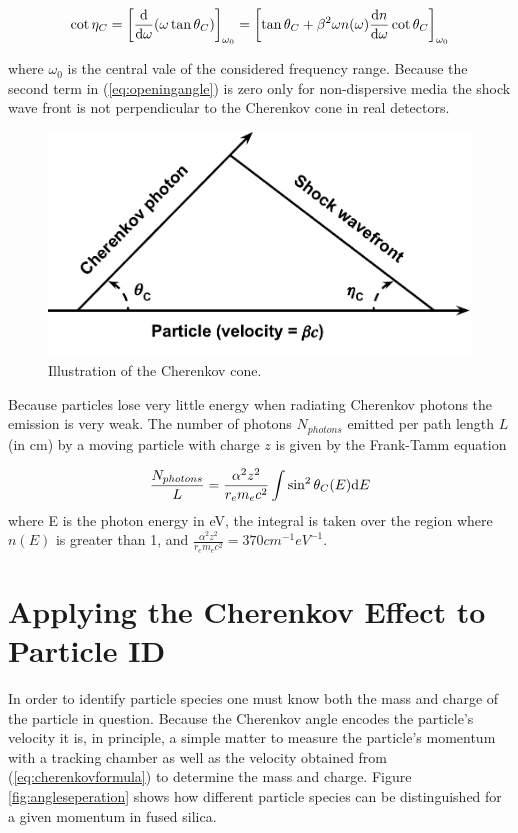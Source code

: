 \begin{equation}
	\cot\eta_C = \left[\frac{\mathrm{d}}{\mathrm{d}\omega}(\omega \tan\theta_{C}) \right]_{\omega_0} = \left[\tan\theta_{C} + \beta^2\omega n(\omega) \frac{\mathrm{d} n}{\mathrm{d}\omega}\cot\theta_{C} \right]_{\omega_0}
	\label{eq:openingangle}
\end{equation}

where $\omega_0$ is the central vale of the considered frequency range. Because the second term in (\ref{eq:openingangle}) is zero only for non-dispersive media the shock wave front is not perpendicular to the Cherenkov cone in real detectors.

\begin{figure}[ht]
	\centering
	\includegraphics[scale=1]{figures/Cherenkov_cone.pdf}
	\caption{Illustration of the Cherenkov cone.}
	\label{fig:cherenkovcone}
\end{figure}

Because particles lose very little energy when radiating Cherenkov photons the emission is very weak. The number of photons $N_{photons}$ emitted per path length $L$ (in cm) by a moving particle with charge $z$ is given by the Frank-Tamm equation

\begin{equation}
	\frac{N_{photons}}{L} = \frac{\alpha^2 z^2}{r_e m_e c^2} \int \sin^2\theta_{C} (E) \mathrm{d} E
	\label{eq:nphotons}
\end{equation}
where E is the photon energy in eV, the integral is taken over the region where $n(E)$ is greater than 1, and $\frac{\alpha^2 z^2}{r_e m_e c^2} = 370\unit{cm}^{-1}\unit{eV}^{-1}$.

\section{Applying the Cherenkov Effect to Particle ID}
In order to identify particle species one must know both the mass and charge of the particle in question. Because the Cherenkov angle encodes the particle's velocity it is, in principle, a simple matter to measure the particle's momentum with a tracking chamber as well as the velocity obtained from (\ref{eq:cherenkovformula}) to determine the mass and charge. Figure \ref{fig:angleseperation} shows how different particle species can be distinguished for a given momentum in fused silica.

